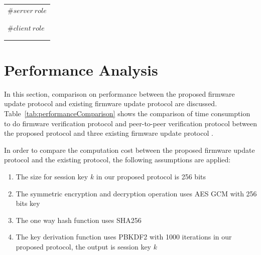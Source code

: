 \begin{table}[H]
	\begin{center}
		\begin{tabular}{l}
			\hline
			$\# server\ role$\\
			\boldmath{$claim(Server,Niagree)$}\\
			\boldmath{$claim(Server,Nisynch)$}\\
			$\# client\ role$\\
			\boldmath{$claim(Client,Niagree)$}\\
			\boldmath{$claim(Client,Nisynch)$}\\
			\hline
		\end{tabular}
	\end{center}
\end{table}

\section{Performance Analysis} 
\label{sec:performance}

In this section, comparison on performance between the proposed firmware update protocol and existing firmware update protocol are discussed. Table~\ref{tab:performanceComparison} shows the comparison of time consumption to do firmware verification protocol and peer-to-peer verification protocol between the proposed protocol and three existing firmware update protocol \cite{yohan,lee,boudguiga}.

In order to compare the computation cost between the proposed firmware update protocol and the existing protocol, the following assumptions are applied:
\begin{enumerate}
	\item The size for session key $k$ in our proposed protocol is 256 bits
	\item The symmetric encryption and decryption operation uses AES GCM with 256 bits key
	\item The one way hash function uses SHA256
	\item The key derivation function uses PBKDF2 with 1000 iterations in our proposed protocol, the output is session key $k$
\end{enumerate}

